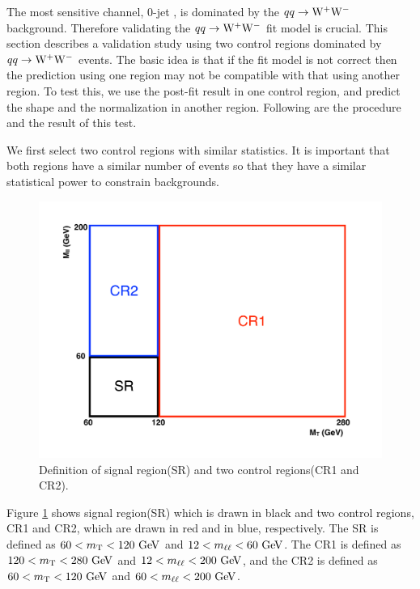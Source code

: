 The most sensitive channel, 0-jet \DF, is dominated by the $qq\rightarrow\mathrm{W}^+\mathrm{W}^-$ background. 
Therefore validating the $qq\rightarrow\mathrm{W}^+\mathrm{W}^-$ fit model is crucial. 
This section describes a validation study using two 
control regions dominated by $qq\rightarrow\mathrm{W}^+\mathrm{W}^-$ events.
The basic idea is that if the fit model is not correct then the prediction using 
one region may not be compatible with that using another region. To test this, 
we use the post-fit result in one control region, and predict the shape 
and the normalization in another region. 
Following are the procedure and the result of this test. 

We first select two control regions with similar statistics. It is important that 
both regions have a similar number of events so that they have a similar statistical 
power to constrain backgrounds. 
%
\begin{figure}[!hbtp]
\centering
\includegraphics[width=.6\textwidth]{figures/WWctl_scheme.pdf}
\caption{Definition of signal region(SR) and two control regions(CR1 and CR2). }
\label{fig:WWctlregions}
\end{figure}
Figure \ref{fig:WWctlregions} shows signal region(SR) which is drawn in black 
and two control regions, CR1 and CR2, which are drawn in red and in blue, respectively. 
The SR is defined as $60<m_{\mathrm{T}}<120~\mathrm{Ge\kern -0.1em V}$ and $12<m_{\ell\ell}<60~\mathrm{Ge\kern -0.1em V}$. 
The CR1 is defined as $120<m_{\mathrm{T}}<280~\mathrm{Ge\kern -0.1em V}$ and $12<m_{\ell\ell}<200~\mathrm{Ge\kern -0.1em V}$, 
and the CR2 is defined as $60<m_{\mathrm{T}}<120~\mathrm{Ge\kern -0.1em V}$ and $60<m_{\ell\ell}<200~\mathrm{Ge\kern -0.1em V}$. 
%
